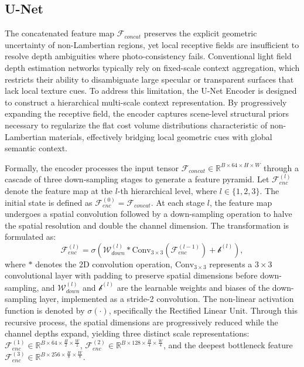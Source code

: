\documentclass[lettersize,journal]{IEEEtran}
\begin{document}
\subsection{U-Net}

The concatenated feature map $\mathcal{F}_{concat}$ preserves the explicit geometric uncertainty of non-Lambertian regions, yet local receptive fields are insufficient to resolve depth ambiguities where photo-consistency fails. Conventional light field depth estimation networks \cite{heber2018, li2021} typically rely on fixed-scale context aggregation, which restricts their ability to disambiguate large specular or transparent surfaces that lack local texture cues. To address this limitation, the U-Net Encoder is designed to construct a hierarchical multi-scale context representation. By progressively expanding the receptive field, the encoder captures scene-level structural priors necessary to regularize the flat cost volume distributions characteristic of non-Lambertian materials, effectively bridging local geometric cues with global semantic context.

Formally, the encoder processes the input tensor $\mathcal{F}_{concat} \in \mathbb{R}^{B \times 64 \times H \times W}$ through a cascade of three down-sampling stages to generate a feature pyramid. Let $\mathcal{F}_{enc}^{(l)}$ denote the feature map at the $l$-th hierarchical level, where $l \in \{1, 2, 3\}$. The initial state is defined as $\mathcal{F}_{enc}^{(0)} = \mathcal{F}_{concat}$. At each stage $l$, the feature map undergoes a spatial convolution followed by a down-sampling operation to halve the spatial resolution and double the channel dimension. The transformation is formulated as:
\begin{equation}
\mathcal{F}_{enc}^{(l)} = \sigma \left( \mathcal{W}_{down}^{(l)} * \text{Conv}_{3 \times 3} \left( \mathcal{F}_{enc}^{(l-1)} \right) + \mathcal{b}^{(l)} \right),
\end{equation}
where $*$ denotes the 2D convolution operation, $\text{Conv}_{3 \times 3}$ represents a $3 \times 3$ convolutional layer with padding to preserve spatial dimensions before down-sampling, and $\mathcal{W}_{down}^{(l)}$ and $\mathcal{b}^{(l)}$ are the learnable weights and biases of the down-sampling layer, implemented as a stride-2 convolution. The non-linear activation function is denoted by $\sigma(\cdot)$, specifically the Rectified Linear Unit. Through this recursive process, the spatial dimensions are progressively reduced while the channel depths expand, yielding three distinct scale representations: $\mathcal{F}_{enc}^{(1)} \in \mathbb{R}^{B \times 64 \times \frac{H}{2} \times \frac{W}{2}}$, $\mathcal{F}_{enc}^{(2)} \in \mathbb{R}^{B \times 128 \times \frac{H}{4} \times \frac{W}{4}}$, and the deepest bottleneck feature $\mathcal{F}_{enc}^{(3)} \in \mathbb{R}^{B \times 256 \times \frac{H}{8} \times \frac{W}{8}}$.
\end{document}
